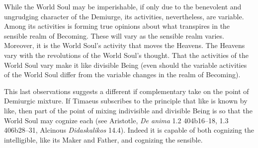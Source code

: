 While the World Soul may be imperishable, if only due to the benevolent and ungrudging character of the Demiurge, its activities, nevertheless, are variable. Among its activities is forming true opinions about what transpires in the sensible realm of Becoming. These will vary as the sensible realm varies. Moreover, it is the World Soul's activity that moves the Heavens. The Heavens vary with the revolutions of the World Soul's thought. That the activities of the World Soul vary make it like divisible Being (even should the variable activities of the World Soul differ from the variable changes in the realm of Becoming).

This last observations suggests a different if complementary take on the point of Demiurgic mixture. If Timaeus subscribes to the principle that like is known by like, then part of the point of mixing indivisible and divisible Being is so that the World Soul may cognize each (see Aristotle, \emph{De anima} 1.2 404b16--18, 1.3 406b28--31, Alcinous \emph{Didaskalikos} 14.4). Indeed it is capable of both cognizing the intelligible, like its Maker and Father, and cognizing the sensible. 


